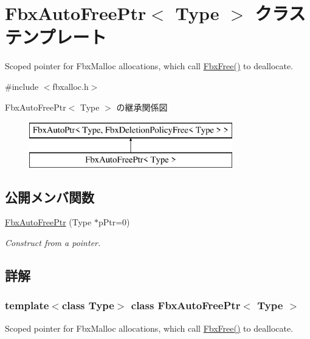 \hypertarget{class_fbx_auto_free_ptr}{}\section{Fbx\+Auto\+Free\+Ptr$<$ Type $>$ クラステンプレート}
\label{class_fbx_auto_free_ptr}


Scoped pointer for Fbx\+Malloc allocations, which call \hyperlink{fbxalloc_8h_a8252906713d55f4c56e7ba84221d3852}{Fbx\+Free()} to deallocate.  




{\ttfamily \#include $<$fbxalloc.\+h$>$}

Fbx\+Auto\+Free\+Ptr$<$ Type $>$ の継承関係図\begin{figure}[H]
\begin{center}
\leavevmode
\includegraphics[height=2.000000cm]{class_fbx_auto_free_ptr}
\end{center}
\end{figure}
\subsection*{公開メンバ関数}
\begin{DoxyCompactItemize}
\item 
\hyperlink{class_fbx_auto_free_ptr_a02473c8a84df8d8fb6803a2d4224819d}{Fbx\+Auto\+Free\+Ptr} (Type $\ast$p\+Ptr=0)
\begin{DoxyCompactList}\small\item\em Construct from a pointer. \end{DoxyCompactList}\end{DoxyCompactItemize}


\subsection{詳解}
\subsubsection*{template$<$class Type$>$\newline
class Fbx\+Auto\+Free\+Ptr$<$ Type $>$}

Scoped pointer for Fbx\+Malloc allocations, which call \hyperlink{fbxalloc_8h_a8252906713d55f4c56e7ba84221d3852}{Fbx\+Free()} to deallocate. 

